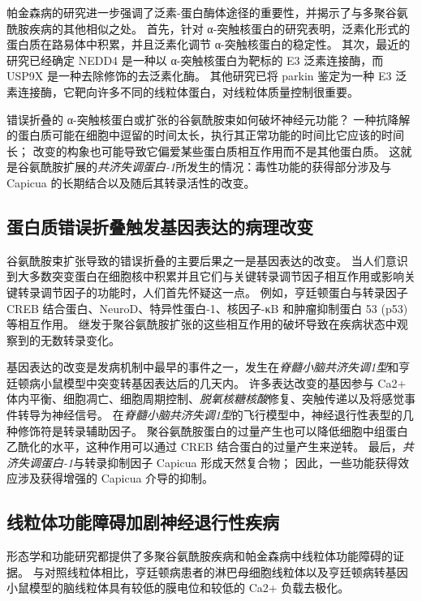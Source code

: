 帕金森病的研究进一步强调了泛素-蛋白酶体途径的重要性，并揭示了与多聚谷氨酰胺疾病的其他相似之处。
首先，针对 α-突触核蛋白的研究表明，泛素化形式的蛋白质在路易体中积累，并且泛素化调节 α-突触核蛋白的稳定性。
其次，最近的研究已经确定 NEDD4 是一种以 α-突触核蛋白为靶标的 E3 泛素连接酶，而 USP9X 是一种去除修饰的去泛素化酶。
其他研究已将 parkin 鉴定为一种 E3 泛素连接酶，它靶向许多不同的线粒体蛋白，对线粒体质量控制很重要。


错误折叠的 α-突触核蛋白或扩张的谷氨酰胺束如何破坏神经元功能？
一种抗降解的蛋白质可能在细胞中逗留的时间太长，执行其正常功能的时间比它应该的时间长；
改变的构象也可能导致它偏爱某些蛋白质相互作用而不是其他蛋白质。
这就是谷氨酰胺扩展的\textit{共济失调蛋白-1}所发生的情况：毒性功能的获得部分涉及与 Capicua 的长期结合以及随后其转录活性的改变。



\subsection{蛋白质错误折叠触发基因表达的病理改变}

谷氨酰胺束扩张导致的错误折叠的主要后果之一是基因表达的改变。
当人们意识到大多数突变蛋白在细胞核中积累并且它们与关键转录调节因子相互作用或影响关键转录调节因子的功能时，人们首先怀疑这一点。
例如，亨廷顿蛋白与转录因子 CREB 结合蛋白、NeuroD、特异性蛋白-1、核因子-κB 和肿瘤抑制蛋白 53 (p53) 等相互作用。
继发于聚谷氨酰胺扩张的这些相互作用的破坏导致在疾病状态中观察到的无数转录变化。


基因表达的改变是发病机制中最早的事件之一，发生在\textit{脊髓小脑共济失调1型}和亨廷顿病小鼠模型中突变转基因表达后的几天内。
许多表达改变的基因参与 Ca2+ 体内平衡、细胞凋亡、细胞周期控制、\textit{脱氧核糖核酸}修复、突触传递以及将感觉事件转导为神经信号。
在\textit{脊髓小脑共济失调1型}的飞行模型中，神经退行性表型的几种修饰符是转录辅助因子。
聚谷氨酰胺蛋白的过量产生也可以降低细胞中组蛋白乙酰化的水平，这种作用可以通过 CREB 结合蛋白的过量产生来逆转。
最后，\textit{共济失调蛋白-1}与转录抑制因子 Capicua 形成天然复合物；
因此，一些功能获得效应涉及获得增强的 Capicua 介导的抑制。



\subsection{线粒体功能障碍加剧神经退行性疾病}

形态学和功能研究都提供了多聚谷氨酰胺疾病和帕金森病中线粒体功能障碍的证据。
与对照线粒体相比，亨廷顿病患者的淋巴母细胞线粒体以及亨廷顿病转基因小鼠模型的脑线粒体具有较低的膜电位和较低的 Ca2+ 负载去极化。


